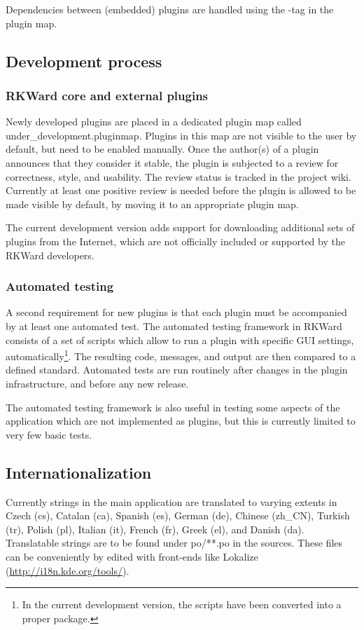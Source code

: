 Dependencies between (embedded) plugins are handled using the -tag in the plugin map.

\subsection{Development process}
\subsubsection{RKWard core and external plugins}
\label{sec:technical_processes_plugins}
Newly developed plugins are placed in a dedicated plugin map called
under\_development.pluginmap. Plugins in this map are not visible to the user by
default, but need to be enabled manually. Once the author(s) of a plugin
announces that they consider it stable, the plugin is subjected to a review for
correctness, style, and usability. The review status is tracked in the project
wiki. Currently at least one positive review is needed before the plugin is
allowed to be made visible by default, by moving it to an appropriate plugin
map.

The current development version adds support for downloading additional sets of
plugins from the Internet, which are not officially included or supported by the
RKWard developers.

\subsubsection{Automated testing}
\label{sec:technical_processes_automatedtesting}
A second requirement for new plugins is that each plugin must be accompanied by
at least one automated test. The automated testing framework in RKWard consists
of a set of  scripts which allow to run a plugin with specific GUI settings,
automatically\footnote{
  In the current development version, the scripts have been converted into a proper
   package.
}. The resulting  code,  messages, and output are then compared
to a defined standard. Automated tests are run routinely after changes in the
plugin infrastructure, and before any new release.

The automated testing framework is also useful in testing some aspects of the
application which are not implemented as plugins, but this is currently limited
to very few basic tests.

\subsection{Internationalization}
\label{sec:technical_internationalization}
Currently strings in the main application are translated to varying extents in
Czech (cs), Catalan (ca), Spanish (es), German (de), Chinese (zh\_CN), Turkish
(tr), Polish (pl), Italian (it), French (fr), Greek (el), and Danish (da).
Translatable strings are to be found under po/**.po in the sources. These files
can be conveniently by edited with front-ends like Lokalize
(\url{http://i18n.kde.org/tools/}). 

